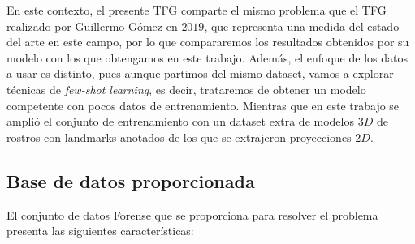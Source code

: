     \medskip

    \noindent En este contexto, el presente TFG comparte el mismo problema que el TFG realizado por Guillermo Gómez en $2019$, que representa una medida del estado del arte en este campo, por lo que compararemos los resultados obtenidos por su modelo con los que obtengamos en este trabajo. Además, el enfoque de los datos a usar es distinto, pues aunque partimos del mismo dataset, vamos a explorar técnicas de \textit{few-shot learning}, es decir, trataremos de obtener un modelo competente con pocos datos de entrenamiento. Mientras que en este trabajo se amplió el conjunto de entrenamiento con un dataset extra de modelos $3D$ de rostros con landmarks anotados de los que se extrajeron proyecciones $2D$.



    \subsection{Base de datos proporcionada}
        \noindent El conjunto de datos Forense que se proporciona para resolver el problema presenta las siguientes características: 

